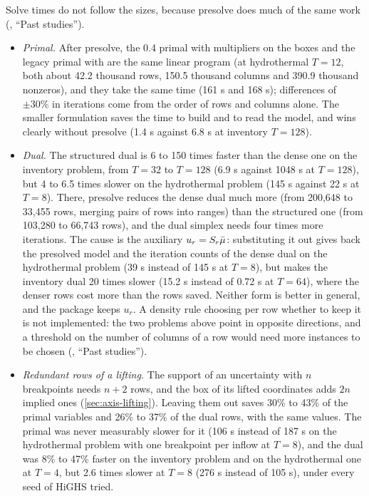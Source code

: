 Solve times do not follow the sizes, because presolve does much of the same work (, ``Past studies'').
\begin{itemize}
\item \emph{Primal.} After presolve, the 0.4 primal with multipliers on the boxes and the legacy primal with  are the same linear program
(at hydrothermal $T = 12$, both about 42.2 thousand rows, 150.5 thousand columns and 390.9 thousand nonzeros),
and they take the same time (161 s and 168 s); differences of $\pm30\%$ in iterations come from the order of rows and columns alone.
The smaller formulation saves the time to build and to read the model, and wins clearly without presolve (1.4 s against 6.8 s at inventory $T = 128$).
\item \emph{Dual.} The structured dual is 6 to 150 times faster than the dense one on the inventory problem, from $T = 32$ to $T = 128$ (6.9 s against 1048 s at $T = 128$),
but 4 to 6.5 times slower on the hydrothermal problem (145 s against 22 s at $T = 8$).
There, presolve reduces the dense dual much more (from 200,648 to 33,455 rows, merging pairs of rows into ranges) than the structured one (from 103,280 to 66,743 rows),
and the dual simplex needs four times more iterations.
The cause is the auxiliary $u_r = S_r\bar\mu$: substituting it out gives back the presolved model and the iteration counts of the dense dual on the hydrothermal problem (39 s instead of 145 s at $T = 8$),
but makes the inventory dual 20 times slower (15.2 s instead of 0.72 s at $T = 64$), where the denser rows cost more than the rows saved.
Neither form is better in general, and the package keeps $u_r$.
A density rule choosing per row whether to keep it is not implemented:
the two problems above point in opposite directions, and a threshold on the number of columns of a row would need more instances to be chosen
(, ``Past studies'').
\item \emph{Redundant rows of a lifting.} The support of an uncertainty with $n$ breakpoints needs $n+2$ rows, and the box of its lifted coordinates adds $2n$ implied ones (\cref{sec:axis-lifting}).
Leaving them out saves 30\% to 43\% of the primal variables and 26\% to 37\% of the dual rows, with the same values.
The primal was never measurably slower for it (106 s instead of 187 s on the hydrothermal problem with one breakpoint per inflow at $T = 8$),
and the dual was 8\% to 47\% faster on the inventory problem and on the hydrothermal one at $T = 4$, but 2.6 times slower at $T = 8$ (276 s instead of 105 s), under every seed of HiGHS tried.

\end{itemize}
